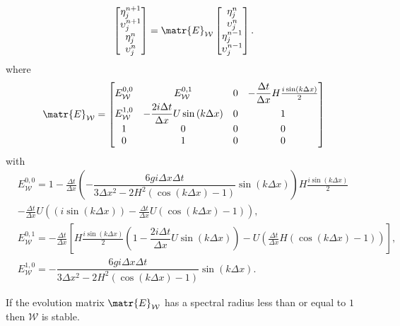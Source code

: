 \begin{equation}
\begin{bmatrix}
\eta^{n+1}_j \\
\upsilon^{n+1}_j\\
\eta^n_j \\
\upsilon^n_j
\end{bmatrix}= \matr{E}_{\mathcal{W}}  \begin{bmatrix}
\eta^{n}_j \\
\upsilon^{n}_j\\
\eta^{n-1}_j \\
\upsilon^{n-1}_j
\end{bmatrix}.
\end{equation}
where
\begin{equation}
\matr{E}_{\mathcal{W}} = \begin{bmatrix}
{E}_{\mathcal{W}}^{0,0} & {E}_{\mathcal{W}}^{0,1} & 0 & - \dfrac{\Delta t}{\Delta x}H\frac{i\sin\left(k\Delta x\right)}{2} \\
{E}_{\mathcal{W}}^{1,0} & -\dfrac{2i \Delta t }{\Delta x} U \sin\left(k \Delta x\right)&0 & 1 \\
1&0&0&0\\
0&1&0&0
\end{bmatrix}
\end{equation}
with
\begin{align*}
&{E}_{\mathcal{W}}^{0,0} = 1 - \frac{\Delta t}{\Delta x}\left(-\dfrac{6 gi \Delta x\Delta t}{3 \Delta x^2 -2{H^2} \left( \cos\left(k \Delta x\right) - 1 \right)}{ \sin\left(k \Delta x\right)}\right)H\frac{i\sin\left(k\Delta x\right)}{2} \\ &- \frac{\Delta t}{\Delta x}U\left(\left(i\sin\left(k\Delta x\right)\right) - \frac{\Delta t}{\Delta x}U\left(\cos\left(k\Delta x\right) - 1\right)\right), \\
&{E}_{\mathcal{W}}^{0,1} = - \frac{\Delta t}{\Delta x} \left[H\frac{i\sin\left(k\Delta x\right)}{2}\left( 1 -\dfrac{2i \Delta t }{\Delta x} U \sin\left(k \Delta x\right) \right)   -U\left(\frac{\Delta t}{\Delta x}H\left(\cos\left(k\Delta x\right) - 1\right)\right) \right],\\
& {E}_{\mathcal{W}}^{1,0} =-\dfrac{6 gi \Delta x\Delta t}{3 \Delta x^2 -2{H^2} \left( \cos\left(k \Delta x\right) - 1 \right)}{ \sin\left(k \Delta x\right)}.
\end{align*}


If the evolution matrix $\matr{E}_{\mathcal{W}}$ has a spectral radius less than or equal to $1$ then $\mathcal{W}$ is stable.

